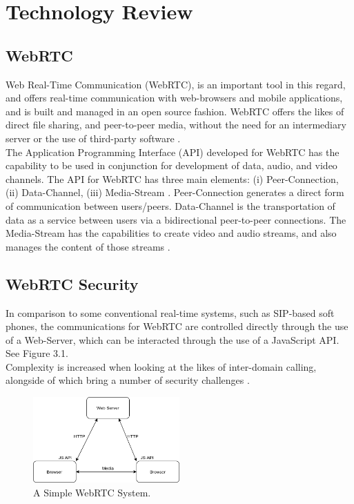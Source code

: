 \chapter{Technology Review}

\section{WebRTC}
Web Real-Time Communication (WebRTC), is an important tool in this regard, and offers real-time communication with web-browsers and mobile applications, and is built and managed in an open source fashion. WebRTC offers the likes of direct file sharing, and peer-to-peer media, without the need for an intermediary server or the use of third-party software \cite{johnston2012webrtc}. 
\\The Application Programming Interface (API) developed for WebRTC has the capability to be used in conjunction for development of data, audio, and video channels. The API for WebRTC has three main elements: (i) Peer-Connection, (ii) Data-Channel, (iii) Media-Stream \cite{jesup2015webrtc}. Peer-Connection generates a direct form of communication between users/peers. Data-Channel is the transportation of data as a service between users via a bidirectional peer-to-peer connections. The Media-Stream has the capabilities  to create video and audio streams, and also manages the content of those streams \cite{14003034520191201}. 

\section{WebRTC Security}
In comparison to some conventional real-time systems, such as SIP-based soft phones, the communications for WebRTC are controlled directly through the use of a Web-Server, which can be interacted through the use of a JavaScript API. See Figure 3.1.
\\Complexity is increased when looking at the likes of inter-domain calling, alongside of which bring a number of security challenges \cite{rescorla2013webrtc}.

\begin{figure}[h!]
    \caption{A Simple WebRTC System.}
    \label{image:simpleWebRTCSystem}
    \centering
    \includegraphics[width=0.5\textwidth]{images/simpleWebRTCSystem.png}
\end{figure}

